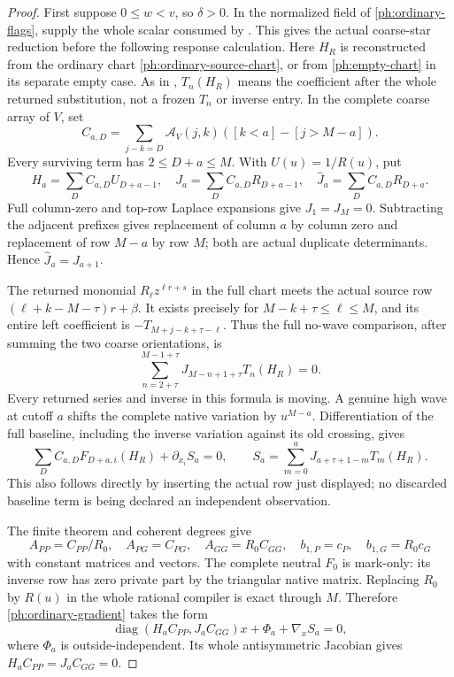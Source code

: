 \documentclass[11pt,a4paper]{amsart}
\numberwithin{equation}{section}
\theoremstyle{plain}
\theoremstyle{definition}
\begin{document}
\begin{proof}
First suppose \(0\le w<v\), so \(\delta>0\).
In the normalized field of \eqref{ph:ordinary-flags},
 supply the whole scalar
consumed by .  This gives the actual
coarse-star reduction before the following response calculation.
Here \(H_R\) is reconstructed from the ordinary chart
\eqref{ph:ordinary-source-chart}, or from \eqref{ph:empty-chart}
in its separate empty case.  As in ,
\(T_n(H_R)\) means the coefficient after the whole returned
substitution, not a frozen \(T_n\) or inverse entry.
In the complete coarse array of \(V\), set
\[
 C_{a,D}=\sum_{j-k=D}\mathcal A_V(j,k)
             ([k<a]-[j>M-a]).
\]
Every surviving term has \(2\le D+a\le M\).
With \(U(u)=1/R(u)\), put
\[
 H_a=\sum_D C_{a,D}U_{D+a-1},\quad
 J_a=\sum_D C_{a,D}R_{D+a-1},\quad
 \widehat J_a=\sum_D C_{a,D}R_{D+a}.
\]
Full column-zero and top-row Laplace expansions give \(J_1=J_M=0\).
Subtracting the adjacent prefixes gives replacement of column \(a\) by
column zero and replacement of row \(M-a\) by row \(M\); both are actual
duplicate determinants.  Hence \(\widehat J_a=J_{a+1}\).

The returned monomial \(R_\ell z^{\ell r+s}\) in the full chart meets
the actual source row
\((\ell+k-M-\tau)r+\beta\).  It exists precisely for
\(M-k+\tau\le\ell\le M\), and its entire left coefficient is
\(-T_{M+j-k+\tau-\ell}\).
Thus the full no-wave comparison, after summing the two coarse
orientations, is
\begin{equation}\label{ph:ordinary-baseline}
 \sum_{n=2+\tau}^{M-1+\tau}J_{M-n+1+\tau}T_n(H_R)=0.
\end{equation}
Every returned series and inverse in this formula is moving.
A genuine high wave at cutoff \(a\) shifts the complete native variation
by \(u^{M-a}\).  Differentiation of the full baseline, including the
inverse variation against its old crossing, gives
\begin{equation}\label{ph:ordinary-gradient}
 \sum_D C_{a,D}F_{D+a,i}(H_R)+\partial_{x_i}S_a=0,
 \qquad S_a=\sum_{m=0}^{a}J_{a+\tau+1-m}T_m(H_R).
\end{equation}
This also follows directly by inserting the actual row just displayed;
no discarded baseline term is being declared an independent observation.

The finite theorem and coherent degrees give
\[
 A_{PP}=C_{PP}/R_0,\quad A_{PG}=C_{PG},\quad
 A_{GG}=R_0C_{GG},\quad
 b_{1,P}=c_P,\quad b_{1,G}=R_0c_G
\]
with constant matrices and vectors.
The complete neutral \(F_0\) is mark-only: its inverse row has zero
private part by the triangular native matrix.
Replacing \(R_0\) by \(R(u)\) in the whole rational compiler is exact
through \(M\).  Therefore \eqref{ph:ordinary-gradient} takes the form
\[
 \operatorname{diag}(H_aC_{PP},J_aC_{GG})x+\Phi_a+\nabla_xS_a=0,
\]
where \(\Phi_a\) is outside-independent.  Its whole antisymmetric
Jacobian gives \(H_aC_{PP}=J_aC_{GG}=0\).


\end{proof}
\end{document}
